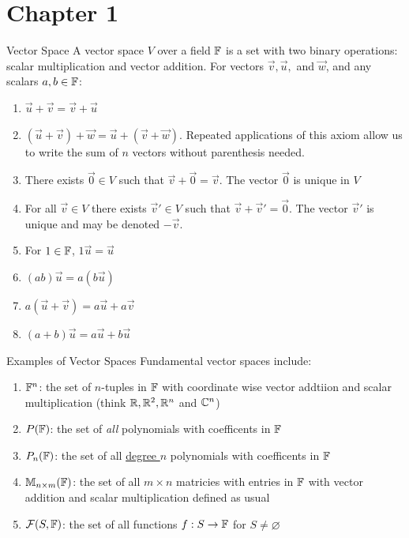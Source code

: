\documentclass{exam}
\begin{document}
\section*{Chapter 1}
    \begin{defbox}{Vector Space}
        A vector space $V$ over a field $\mathbb F$ is a set with two binary operations: scalar multiplication and vector addition. For vectors $\vec{v}, \vec{u},$ and $\vec{w}$, and any scalars $a, b \in \mathbb F$:
        \begin{enumerate}
            \item $\vec{u} + \vec{v} = \vec{v} + \vec{u}$
            \item $(\vec{u} + \vec{v}) + \vec{w} = \vec{u} + (\vec{v} + \vec{w})$. Repeated applications of this axiom allow us to write the sum of $n$ vectors without parenthesis needed.
            \item There exists $\vec{0} \in V$ such that $\vec{v} + \vec{0} = \vec{v}$. The vector $\vec{0}$ is unique in $V$
            \item For all $\vec{v} \in V$ there exists $\vec{v}' \in V$ such that $\vec{v} + \vec{v}' = \vec{0}$. The vector $\vec{v}'$ is unique and may be denoted $-\vec{v}$.
            \item For $1 \in \mathbb F$, $1\vec{u} = \vec{u}$  
            \item $(ab)\vec{u} = a(b\vec{u})$
            \item $a(\vec{u} + \vec{v}) = a\vec{u} + a\vec{v}$
            \item $(a + b)\vec{u} = a\vec{u} + b\vec{u}$
        \end{enumerate}
    \end{defbox}

    \begin{example}{Examples of Vector Spaces}{}
        Fundamental vector spaces include: 
        \begin{enumerate}
            \item $\mathbb F^{n}$: the set of $n$-tuples in $\mathbb F$ with coordinate wise vector addtiion and scalar multiplication (think $\mathbb R, \mathbb R^2, \mathbb R^n$ and $\mathbb C^n$)
            \item $P(\mathbb F)$: the set of \emph{all} polynomials with coefficents in $\mathbb F$
            \item $P_n(\mathbb F)$: the set of all \underline{degree $n$} polynomials with coefficents in $\mathbb F$
            \item $\mathbb M_{n \times m}(\mathbb F)$: the set of all $m \times n$ matricies with entries in $\mathbb F$ with vector addition and scalar multiplication defined as usual
            \item $\mathcal{F}(S, \mathbb F)$: the set of all functions $f: S \to \mathbb F$ for $S \neq \varnothing$
        \end{enumerate}
    \end{example}
\end{document}
